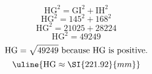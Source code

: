 \[\text{HG}^{2}=\text{GI}^{2}+\text{IH}^{2}\]
\[\text{HG}^{2}=145^{2}+168^{2}\]
\[\text{HG}^{2}=21025+28224\]
\[\text{HG}^{2}=49249\]
\[\text{HG}=\sqrt{\mathstrut 49249}\text{ because HG is positive.}\]
\[\uline{\text{HG}\approx\SI{221.92}{mm}}\]